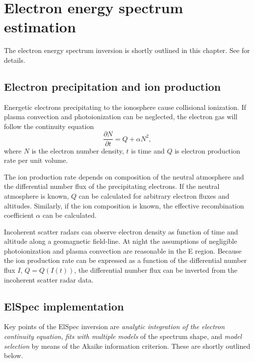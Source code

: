 \documentclass[12pt,a4paper]{report}
\begin{document}
\chapter{Electron energy spectrum estimation}

The electron energy spectrum inversion is shortly outlined in this chapter. See \cite[][and references therein]{virtanen2018} for details. 

\section{Electron precipitation and ion production}

Energetic electrons precipitating to the ionosphere cause collisional ionization. If plasma convection and photoionization can be neglected, the electron gas will follow the continuity equation
\begin{equation}
\frac{\partial N}{\partial t} = Q + \alpha N^2,
\label{eqContinuity}
\end{equation}
where $N$ is the electron number density, $t$ is time  and $Q$ is electron production rate per unit volume.

The ion production rate depends on composition of the neutral atmosphere and the differential number flux of the precipitating electrons. If the neutral atmosphere is known, $Q$ can be calculated for arbitrary electron fluxes and altitudes. Similarly, if the ion composition is known, the effective recombination coefficient $\alpha$ can be calculated. 

Incoherent scatter radars can observe electron density as function of time and altitude along a geomagnetic field-line. At night the assumptions of negligible photoionization and plasma convection are reasonable in the E region. Because the ion production rate can be expressed as a function of the differential number flux $I$, $Q=Q(I(t))$, the differential number flux can be inverted from the incoherent scatter radar data.



\section{ElSpec implementation}

Key points of the ElSpec inversion are \emph{analytic integration of the electron continuity equation}, \emph{fits with multiple models} of the spectrum shape, and \emph{model selection} by means of the Akaike information criterion. These are shortly outlined below. 
\end{document}
